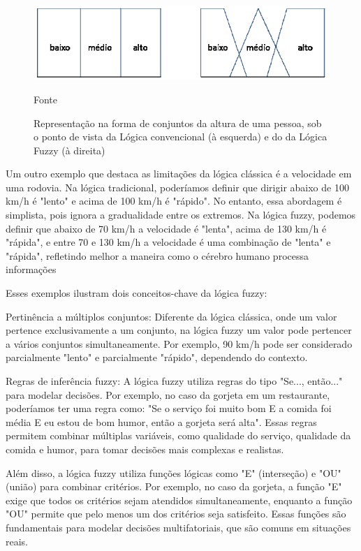 \documentclass[12pt]{article}
\begin{document}
\begin{figure}[ht]
\centering
\includegraphics[width=.9\textwidth]{CompareClassicFuzzy.png}
\caption{Representação na forma de conjuntos da altura de uma pessoa, sob o
ponto de vista da Lógica convencional (à esquerda) e do da Lógica Fuzzy (à direita)}
{\footnotesize Fonte \cite{ConceitFuzzy}}
\label{fig:fig1}
\end{figure}

Um outro exemplo que destaca as limitações da lógica clássica é a velocidade em uma rodovia. Na lógica tradicional, poderíamos definir que dirigir abaixo de 100 km/h é "lento" e acima de 100 km/h é "rápido". No entanto, essa abordagem é simplista, pois ignora a gradualidade entre os extremos. Na lógica fuzzy, podemos definir que abaixo de 70 km/h a velocidade é "lenta", acima de 130 km/h é "rápida", e entre 70 e 130 km/h a velocidade é uma combinação de "lenta" e "rápida", refletindo melhor a maneira como o cérebro humano processa informações 

Esses exemplos ilustram dois conceitos-chave da lógica fuzzy:

    Pertinência a múltiplos conjuntos: Diferente da lógica clássica, onde um valor pertence exclusivamente a um conjunto, na lógica fuzzy um valor pode pertencer a vários conjuntos simultaneamente. Por exemplo, 90 km/h pode ser considerado parcialmente "lento" e parcialmente "rápido", dependendo do contexto.

    Regras de inferência fuzzy: A lógica fuzzy utiliza regras do tipo "Se..., então..." para modelar decisões. Por exemplo, no caso da gorjeta em um restaurante, poderíamos ter uma regra como: "Se o serviço foi muito bom E a comida foi média E eu estou de bom humor, então a gorjeta será alta". Essas regras permitem combinar múltiplas variáveis, como qualidade do serviço, qualidade da comida e humor, para tomar decisões mais complexas e realistas.

Além disso, a lógica fuzzy utiliza funções lógicas como "E" (interseção) e "OU" (união) para combinar critérios. Por exemplo, no caso da gorjeta, a função "E" exige que todos os critérios sejam atendidos simultaneamente, enquanto a função "OU" permite que pelo menos um dos critérios seja satisfeito. Essas funções são fundamentais para modelar decisões multifatoriais, que são comuns em situações reais.
\end{document}
